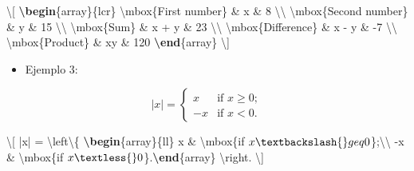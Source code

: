 \documentclass[12pt,a4paper,oneside,]{book}
\newenvironment{Shaded}{\begin{snugshade}}{\end{snugshade}}
\newcommand{\ExtensionTok}[1]{#1}
\newcommand{\KeywordTok}[1]{\textcolor[rgb]{0.13,0.29,0.53}{\textbf{#1}}}
\newcommand{\NormalTok}[1]{#1}
\newcommand{\SpecialCharTok}[1]{\textcolor[rgb]{0.00,0.00,0.00}{#1}}
\newcommand{\SpecialStringTok}[1]{\textcolor[rgb]{0.31,0.60,0.02}{#1}}
\providecommand{\tightlist}{%
  \setlength{\itemsep}{0pt}\setlength{\parskip}{0pt}}
\numberwithin{dummy}{section}
\theoremstyle{ocrenumbox}
\theoremstyle{blacknumex}
\theoremstyle{blacknumbox}
\theoremstyle{ocrenum}
\theoremstyle{ocrenum}
\begin{document}
\begin{Shaded}
\begin{Highlighting}[]
\SpecialStringTok{\textbackslash{}[ }
\KeywordTok{\textbackslash{}begin}\NormalTok{\{}\ExtensionTok{array}\NormalTok{\}}\SpecialStringTok{\{lcr\}}
\SpecialCharTok{\textbackslash{}mbox}\NormalTok{\{First number\}}\SpecialStringTok{ \& x \& 8 }\SpecialCharTok{\textbackslash{}\textbackslash{}}
\SpecialCharTok{\textbackslash{}mbox}\NormalTok{\{Second number\}}\SpecialStringTok{ \& y \& 15 }\SpecialCharTok{\textbackslash{}\textbackslash{}}
\SpecialCharTok{\textbackslash{}mbox}\NormalTok{\{Sum\}}\SpecialStringTok{ \& x + y \& 23 }\SpecialCharTok{\textbackslash{}\textbackslash{}}
\SpecialCharTok{\textbackslash{}mbox}\NormalTok{\{Difference\}}\SpecialStringTok{ \& x {-} y \& {-}7 }\SpecialCharTok{\textbackslash{}\textbackslash{}}
\SpecialCharTok{\textbackslash{}mbox}\NormalTok{\{Product\}}\SpecialStringTok{ \& xy \& 120 }\KeywordTok{\textbackslash{}end}\NormalTok{\{}\ExtensionTok{array}\NormalTok{\}}
\SpecialStringTok{\textbackslash{}]} 
\end{Highlighting}
\end{Shaded}

\begin{itemize}
\tightlist
\item
  Ejemplo 3:
\end{itemize}

\[ |x| = \left\{ \begin{array}{ll}
         x & \mbox{if $x \geq 0$};\\
        -x & \mbox{if $x < 0$}.\end{array} \right. \]

\begin{Shaded}
\begin{Highlighting}[]
\SpecialStringTok{\textbackslash{}[ |x| = }\SpecialCharTok{\textbackslash{}left\textbackslash{}\{}\SpecialStringTok{ }\KeywordTok{\textbackslash{}begin}\NormalTok{\{}\ExtensionTok{array}\NormalTok{\}}\SpecialStringTok{\{ll\}}
\SpecialStringTok{         x \& }\SpecialCharTok{\textbackslash{}mbox}\NormalTok{\{if }\SpecialStringTok{$x \textbackslash{}geq 0$}\NormalTok{\}}\SpecialStringTok{;}\SpecialCharTok{\textbackslash{}\textbackslash{}}
\SpecialStringTok{        {-}x \& }\SpecialCharTok{\textbackslash{}mbox}\NormalTok{\{if }\SpecialStringTok{$x \textless{} 0$}\NormalTok{\}}\SpecialStringTok{.}\KeywordTok{\textbackslash{}end}\NormalTok{\{}\ExtensionTok{array}\NormalTok{\}}\SpecialStringTok{ }\SpecialCharTok{\textbackslash{}right}\SpecialStringTok{. \textbackslash{}]} 
\end{Highlighting}
\end{Shaded}
\end{document}

